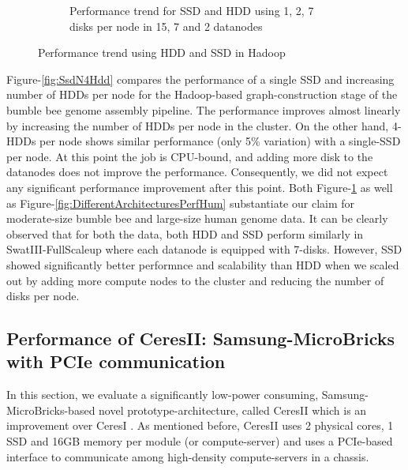 \documentclass[conference]{IEEEtran}
\begin{document}
\begin{figure}[h]
\begin{subfigure}[b]{0.23\textwidth}
          \caption{Performance trend for SSD and HDD using 1, 2, 7 disks per node in 15, 7 and 2 datanodes}
          \label{fig:SsdNHddDiffNodes}
  \end{subfigure}
  \caption{Performance trend using HDD and SSD in Hadoop}
  \label{fig:SsdNHdd}
  \vspace{-1.5em}
\end{figure}

Figure-\ref{fig:SsdN4Hdd} compares the performance of a single SSD and  increasing number of HDDs per node for the Hadoop-based graph-construction stage of the bumble bee genome assembly pipeline.
The performance improves almost linearly by increasing the number of HDDs per node in the cluster.
On the other hand, 4-HDDs per node shows similar performance (only 5\% variation) with a single-SSD per node.
At this point the job is CPU-bound, and adding more disk to the datanodes does not improve the performance.
Consequently, we did not expect any significant performance improvement after this point. 
Both Figure-\ref{fig:SsdNHddDiffNodes} as well as Figure-\ref{fig:DifferentArchitecturesPerfHum} substantiate our claim for moderate-size bumble bee and large-size human genome data. It can be clearly observed that for both the data, both HDD and SSD perform similarly in SwatIII-FullScaleup where each datanode is equipped with 7-disks.
However, SSD showed significantly better performnce and scalability than HDD when we scaled out by adding more compute nodes to the cluster and reducing the number of disks per node.

\subsection {Performance of CeresII: Samsung-MicroBricks with PCIe communication} \label{CeresII:Scaledout-in-a-boxAndSSD}
In this section, we evaluate a significantly low-power consuming, Samsung-MicroBricks-based novel prototype-architecture, called CeresII which is an improvement over CeresI \cite{Cluster:ceres1}. 
As mentioned before, CeresII uses 2 physical cores, 1 SSD and 16GB memory per module (or compute-server) and uses a PCIe-based interface to communicate among high-density compute-servers in a chassis.
\end{document}
